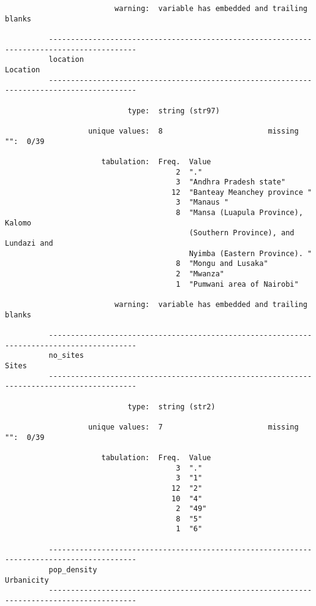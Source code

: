 \documentclass{article}
\begin{document}
\begin{verbatim}
                         warning:  variable has embedded and trailing blanks
          
          ------------------------------------------------------------------------------------------
          location                                                                          Location
          ------------------------------------------------------------------------------------------
          
                            type:  string (str97)
          
                   unique values:  8                        missing "":  0/39
          
                      tabulation:  Freq.  Value
                                       2  "."
                                       3  "Andhra Pradesh state"
                                      12  "Banteay Meanchey province "
                                       3  "Manaus "
                                       8  "Mansa (Luapula Province), Kalomo
                                          (Southern Province), and Lundazi and
                                          Nyimba (Eastern Province). "
                                       8  "Mongu and Lusaka"
                                       2  "Mwanza"
                                       1  "Pumwani area of Nairobi"
          
                         warning:  variable has embedded and trailing blanks
          
          ------------------------------------------------------------------------------------------
          no_sites                                                                             Sites
          ------------------------------------------------------------------------------------------
          
                            type:  string (str2)
          
                   unique values:  7                        missing "":  0/39
          
                      tabulation:  Freq.  Value
                                       3  "."
                                       3  "1"
                                      12  "2"
                                      10  "4"
                                       2  "49"
                                       8  "5"
                                       1  "6"
          
          ------------------------------------------------------------------------------------------
          pop_density                                                                     Urbanicity
          ------------------------------------------------------------------------------------------
          

\end{verbatim}
\end{document}
